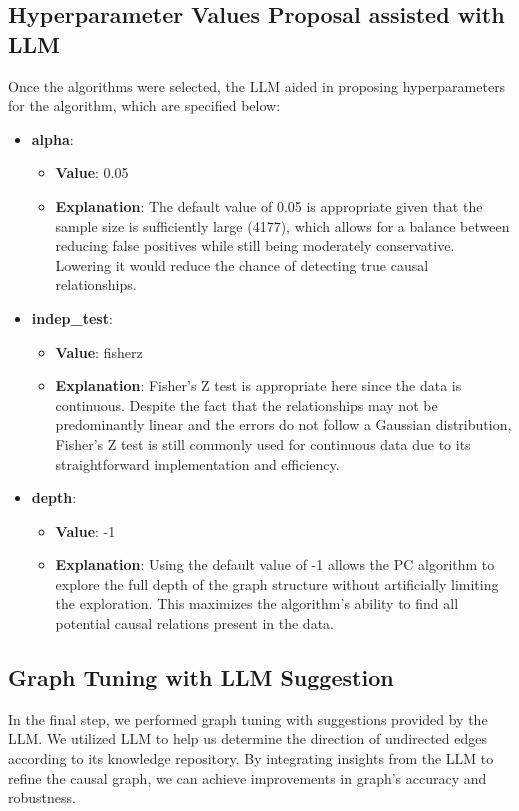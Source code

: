 \documentclass{article}
\begin{document}
\subsection{Hyperparameter Values Proposal assisted with LLM}
Once the algorithms were selected, the LLM aided in proposing hyperparameters 
for the algorithm, which are specified below:

\begin{itemize}

    \item \textbf{alpha}:
    \begin{itemize}
        \item \textbf{Value}: 0.05
        \item \textbf{Explanation}: The default value of 0.05 is appropriate given that the sample size is sufficiently large (4177), which allows for a balance between reducing false positives while still being moderately conservative. Lowering it would reduce the chance of detecting true causal relationships.
    \end{itemize}

    \item \textbf{indep\_test}:
    \begin{itemize}
        \item \textbf{Value}: fisherz
        \item \textbf{Explanation}: Fisher's Z test is appropriate here since the data is continuous. Despite the fact that the relationships may not be predominantly linear and the errors do not follow a Gaussian distribution, Fisher's Z test is still commonly used for continuous data due to its straightforward implementation and efficiency.
    \end{itemize}

    \item \textbf{depth}:
    \begin{itemize}
        \item \textbf{Value}: -1
        \item \textbf{Explanation}: Using the default value of -1 allows the PC algorithm to explore the full depth of the graph structure without artificially limiting the exploration. This maximizes the algorithm's ability to find all potential causal relations present in the data.
    \end{itemize}

\end{itemize}

\subsection{Graph Tuning with LLM Suggestion}
In the final step, we performed graph tuning with suggestions provided by the LLM.
We utilized LLM to help us determine the direction of undirected edges according to its knowledge repository.
By integrating insights from the LLM to refine the causal graph, we can achieve improvements in graph's accuracy and robustness.
\end{document}
